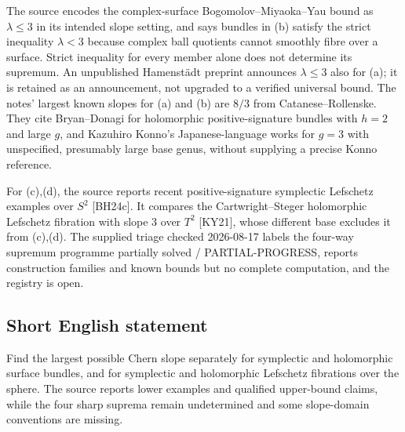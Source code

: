 \documentclass[11pt]{article}
\begin{document}
The source encodes the complex-surface Bogomolov--Miyaoka--Yau bound as $\lambda\leq3$ in its intended slope setting, and says bundles in (b) satisfy the strict inequality $\lambda<3$ because complex ball quotients cannot smoothly fibre over a surface. Strict inequality for every member alone does not determine its supremum. An unpublished Hamenstädt preprint announces $\lambda\leq3$ also for (a); it is retained as an announcement, not upgraded to a verified universal bound. The notes' largest known slopes for (a) and (b) are $8/3$ from Catanese--Rollenske. They cite Bryan--Donagi for holomorphic positive-signature bundles with $h=2$ and large $g$, and Kazuhiro Konno's Japanese-language works for $g=3$ with unspecified, presumably large base genus, without supplying a precise Konno reference.

For (c),(d), the source reports recent positive-signature symplectic Lefschetz examples over $S^2$ [BH24c]. It compares the Cartwright--Steger holomorphic Lefschetz fibration with slope $3$ over $T^2$ [KY21], whose different base excludes it from (c),(d). The supplied triage checked 2026-08-17 labels the four-way supremum programme partially solved / PARTIAL-PROGRESS, reports construction families and known bounds but no complete computation, and the registry is open.
\subsection{Short English statement}
Find the largest possible Chern slope separately for symplectic and holomorphic surface bundles, and for symplectic and holomorphic Lefschetz fibrations over the sphere. The source reports lower examples and qualified upper-bound claims, while the four sharp suprema remain undetermined and some slope-domain conventions are missing.
\end{document}
